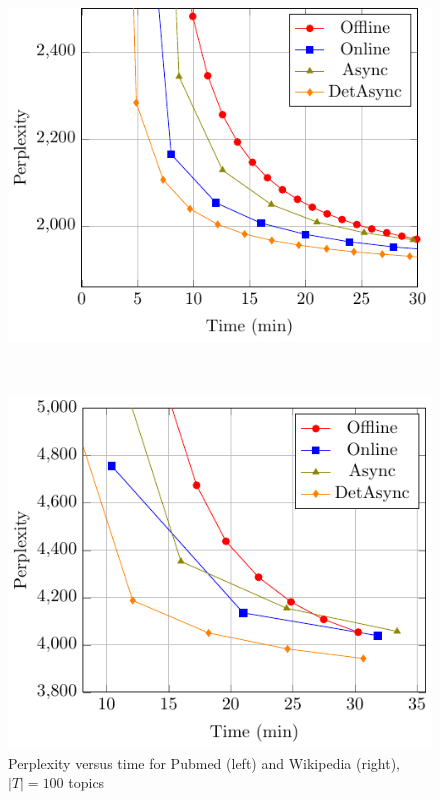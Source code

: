 \documentclass[russian,english]{llncs}
\begin{document}
\begin{figure}[t]
	\centering
	\begin{minipage}[b]{0.4\textwidth}
		\includegraphics[scale=0.65]{plots/perplexity_time_plot_12.pdf}
	\end{minipage}
	$\qquad\quad$
	\begin{minipage}[b]{0.4\textwidth}
		\includegraphics[scale=0.65]{plots/perplexity_time_plot_16.pdf}
	\end{minipage}
	\caption{Perplexity versus time for Pubmed (left) and Wikipedia (right), $|T| = 100$ topics}
	\label{fig:perf}
\end{figure}
\end{document}

